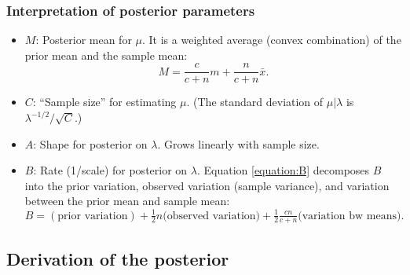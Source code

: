 \documentclass[12pt]{article}
\begin{document}
\subsubsection*{Interpretation of posterior parameters}
\begin{itemize}
\item $M$: Posterior mean for $\mu$. It is a weighted average (convex combination) of the prior mean and the sample mean:
$$ M =\frac{c}{c + n} m + \frac{n}{c + n}\bar x. $$
\item $C$: ``Sample size'' for estimating $\mu$. (The standard deviation of $\mu|\lambda$ is $\lambda^{-1/2}/\sqrt C$.)
\item $A$: Shape for posterior on $\lambda$. Grows linearly with sample size.
\item $B$: Rate (1/scale) for posterior on $\lambda$. Equation \ref{equation:B} decomposes $B$ into the prior variation, observed variation (sample variance), and variation between the prior mean and sample mean:
$$ B = (\text{prior variation}) + \tfrac{1}{2}n\text{(observed variation)} + \tfrac{1}{2}\tfrac{c n}{c + n}\text{(variation bw means)}. $$
\end{itemize}


\subsection{Derivation of the posterior}
\end{document}

